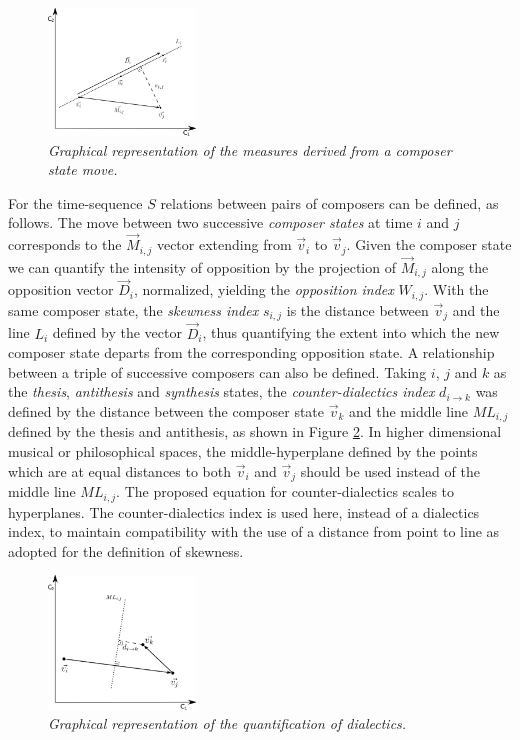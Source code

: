 \documentclass[
 aip,
 jmp,
 amsmath,amssymb,
 reprint,
]{revtex4-1}
\begin{document}
\begin{figure}
  \begin{center}
    \includegraphics[width=0.35\textwidth]{phil-space-desc_}
  \end{center}
  \caption{\it Graphical representation of the measures derived from a 
    \emph{composer state move}.}
  \label{fig.1}
\end{figure}

For the time-sequence $S$ relations between pairs of composers can be
defined, as follows. The move between two successive \emph{composer
  states} at time $i$ and $j$ corresponds to the $\vec{M}_{i,j}$
vector extending from $\vec{v}_i$ to $\vec{v}_j$. Given the composer
state we can quantify the intensity of opposition by the projection of
$\vec{M}_{i,j}$ along the opposition vector $\vec{D}_i$, normalized,
yielding the \emph{opposition index} $W_{i,j}$. With the same composer
state, the \emph{skewness index} $s_{i,j}$ is the distance between
$\vec{v}_j$ and the line $L_i$ defined by the vector $\vec{D}_i$, thus
quantifying the extent into which the new composer state departs from
the corresponding opposition state. A relationship between a triple of
successive composers can also be defined. Taking $i$, $j$ and $k$ as
the \emph{thesis}, \emph{antithesis} and \emph{synthesis} states, the
\emph{counter-dialectics index} $d_{i \rightarrow k}$ was defined by
the distance between the composer state $\vec{v}_k$ and the middle
line $ML_{i,j}$ defined by the thesis and antithesis, as shown in
Figure \ref{fig.2}. In higher dimensional musical or philosophical
spaces, the middle-hyperplane defined by the points which are at equal
distances to both $\vec{v}_i$ and $\vec{v}_j$ should be used instead
of the middle line $ML_{i,j}$. The proposed equation for
counter-dialectics scales to hyperplanes.  The counter-dialectics
index is used here, instead of a dialectics index, to maintain
compatibility with the use of a distance from point to line as adopted
for the definition of skewness.

\begin{figure}
  \begin{center}
    \includegraphics[width=0.35\textwidth]{dialetica_.eps}
  \end{center}
  \caption{\it Graphical representation of the quantification of
    dialectics.}
  \label{fig.2}
\end{figure}
\end{document}
